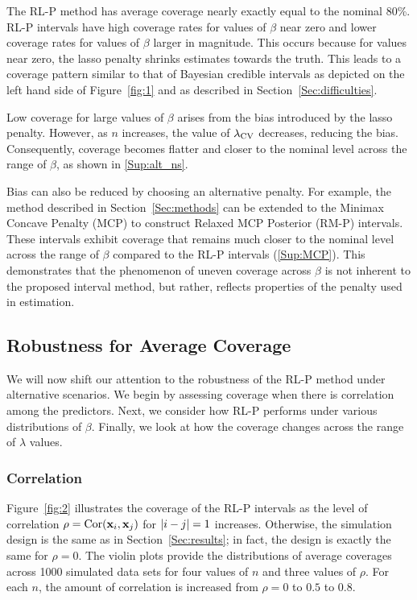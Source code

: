 The RL-P method has average coverage nearly exactly equal to the nominal 80\%. RL-P intervals have high coverage rates for values of $\beta$ near zero and lower coverage rates for values of $\beta$ larger in magnitude. This occurs because for values near zero, the lasso penalty shrinks estimates towards the truth. This leads to a coverage pattern similar to that of Bayesian credible intervals as depicted on the left hand side of Figure~\ref{fig:1} and as described in Section~\ref{Sec:difficulties}.

Low coverage for large values of $\beta$ arises from the bias introduced by the lasso penalty. However, as $n$ increases, the value of $\lambda_{\textrm{CV}}$ decreases, reducing the bias. Consequently, coverage becomes flatter and closer to the nominal level across the range of $\beta$, as shown in \ref{Sup:alt_ns}.

Bias can also be reduced by choosing an alternative penalty. For example, the method described in Section~\ref{Sec:methods} can be extended to the Minimax Concave Penalty (MCP) to construct Relaxed MCP Posterior (RM-P) intervals. These intervals exhibit coverage that remains much closer to the nominal level across the range of $\beta$ compared to the RL-P intervals (\ref{Sup:MCP}). This demonstrates that the phenomenon of uneven coverage across $\beta$ is not inherent to the proposed interval method, but rather, reflects properties of the penalty used in estimation.

\subsection{Robustness for Average Coverage}
\label{Sec:robustness}

We will now shift our attention to the robustness of the RL-P method under alternative scenarios. We begin by assessing coverage when there is correlation among the predictors. Next, we consider how RL-P performs under various distributions of $\beta$. Finally, we look at how the coverage changes across the range of $\lambda$ values.

\subsubsection{Correlation}
\label{Sec:correlation}

Figure~\ref{fig:2} illustrates the coverage of the RL-P intervals as the level of correlation $\rho = \textrm{Cor}(\mathbf{x}_i, \mathbf{x}_j)$ for $\left\lvert i-j\right\rvert = 1$ increases. Otherwise, the simulation design is the same as in Section~\ref{Sec:results}; in fact, the design is exactly the same for $\rho = 0$. The violin plots provide the distributions of average coverages across 1000 simulated data sets for four values of $n$ and three values of $\rho$. For each $n$, the amount of correlation is increased from $\rho = 0$ to $0.5$ to $0.8$.

